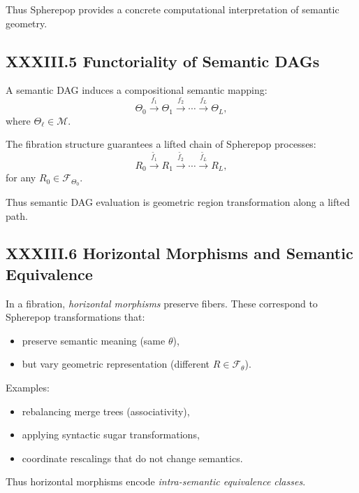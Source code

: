 \documentclass[11pt,letterpaper]{article}
\begin{document}
Thus Spherepop provides a concrete computational interpretation of semantic geometry.

\subsection{XXXIII.5 Functoriality of Semantic DAGs}

A semantic DAG induces a compositional semantic mapping:
\[
\Theta_0 \xrightarrow{f_1} \Theta_1 \xrightarrow{f_2} \cdots \xrightarrow{f_L} \Theta_L,
\]
where $\Theta_\ell \in \mathcal{M}$.

The fibration structure guarantees a lifted chain of Spherepop processes:
\[
R_0 \xrightarrow{\widetilde{f_1}} R_1 \xrightarrow{\widetilde{f_2}} \cdots \xrightarrow{\widetilde{f_L}} R_L,
\]
for any $R_0 \in \mathcal{F}_{\Theta_0}$.

Thus semantic DAG evaluation is geometric region transformation along a lifted path.

\subsection{XXXIII.6 Horizontal Morphisms and Semantic Equivalence}

In a fibration, \emph{horizontal morphisms} preserve fibers. These correspond to Spherepop transformations that:

\begin{itemize}
    \item preserve semantic meaning (same $\theta$),
    \item but vary geometric representation (different $R \in \mathcal{F}_\theta$).
\end{itemize}

Examples:

\begin{itemize}
    \item rebalancing merge trees (associativity),
    \item applying syntactic sugar transformations,
    \item coordinate rescalings that do not change semantics.
\end{itemize}

Thus horizontal morphisms encode \emph{intra-semantic equivalence classes}.
\end{document}
